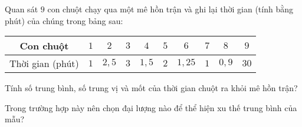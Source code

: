 \begin{bt}%
	Quan sát $9$ con chuột chạy qua một mê hồn trận và ghi lại thời gian (tính bằng phút) của chúng trong bảng sau:
	\begin{center}
		\begin{tabular}{|c|c|c|c|c|c|c|c|c|c|}
			\hline
			Con chuột & $1$ & $2$ & $3$ & $4$ & $5$ & $6$ & $7$ & $8$ & $9$ \\
			\hline
			Thời gian (phút) & $1$ & $2{,}5$ & $3$ & $1{,}5$ & $2$ & $1{,}25$ & $1$ & $0{,}9$ & $30$ \\
			\hline
		\end{tabular}
	\end{center}
	\begin{listEX}[1]
		\item Tính số trung bình, số trung vị và mốt của thời gian chuột ra khỏi mê hồn trận?
		\item Trong trường hợp này nên chọn đại lượng nào để thể hiện xu thế trung bình của mẫu?
	\end{listEX}
\end{bt}
